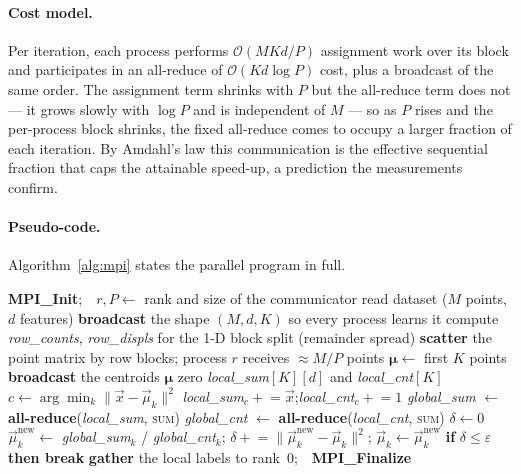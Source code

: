 \documentclass[11pt,a4paper]{article}
\begin{document}
\paragraph{Cost model.}
Per iteration, each process performs $\mathcal{O}(MKd/P)$ assignment work over
its block and participates in an all-reduce of $\mathcal{O}(K d \log P)$ cost,
plus a broadcast of the same order. The assignment term shrinks with $P$ but the
all-reduce term does not --- it grows slowly with $\log P$ and is independent of
$M$ --- so as $P$ rises and the per-process block shrinks, the fixed all-reduce
comes to occupy a larger fraction of each iteration. By Amdahl's law this
communication is the effective sequential fraction that caps the attainable
speed-up, a prediction the measurements confirm.

\paragraph{Pseudo-code.}
Algorithm~\ref{alg:mpi} states the parallel program in full.

\begin{algorithm}[H]
\caption{Parallel $K$-means on process $r$ of $P$ (MPI).}
\label{alg:mpi}
\begin{algorithmic}[1]
\State \textbf{MPI\_Init};\ \ $r,P \gets$ rank and size of the communicator
 read dataset ($M$ points, $d$ features) \EndIf
\State \textbf{broadcast} the shape $(M,d,K)$ so every process learns it
\State compute \textit{row\_counts}, \textit{row\_displs} for the 1-D block split (remainder spread)
\State \textbf{scatter} the point matrix by row blocks; process $r$ receives $\approx M/P$ points
 $\boldsymbol\mu \gets$ first $K$ points \EndIf
\State \textbf{broadcast} the centroids $\boldsymbol\mu$
  \State zero \textit{local\_sum}$[K][d]$ and \textit{local\_cnt}$[K]$ 
    \State $c \gets \arg\min_k \lVert \vec x-\vec\mu_k\rVert^{2}$
    \State \textit{local\_sum}$_c \mathrel{+}= \vec x$;\quad \textit{local\_cnt}$_c \mathrel{+}= 1$
  \EndFor
  \State \textit{global\_sum} $\gets$ \textbf{all-reduce}(\textit{local\_sum}, \textsc{sum}) 
  \State \textit{global\_cnt} $\gets$ \textbf{all-reduce}(\textit{local\_cnt}, \textsc{sum})
  \State $\delta \gets 0$ 
    \State $\vec\mu_k^{\text{new}} \gets$ \textit{global\_sum}$_k$ / \textit{global\_cnt}$_k$;\quad
           $\delta \mathrel{+}= \lVert\vec\mu_k^{\text{new}}-\vec\mu_k\rVert^2$;\quad
           $\vec\mu_k \gets \vec\mu_k^{\text{new}}$
  \EndFor
  \State \textbf{if} $\delta \le \varepsilon$ \textbf{then break} 
\EndFor
\State \textbf{gather} the local labels to rank~0;\ \ \textbf{MPI\_Finalize}
\end{algorithmic}
\end{algorithm}
\end{document}
